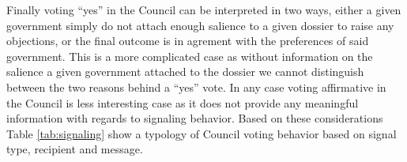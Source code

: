 Finally voting ``yes'' in the Council can be interpreted in two ways, either a given government simply do not attach enough salience to a given dossier to raise any objections, or the final outcome is in agrement with the preferences of said government. This is a more complicated case as without information on the salience a given government attached to the dossier we cannot distinguish between the two reasons behind a ``yes'' vote. In any case voting affirmative in the Council is less interesting case as it does not provide any meaningful information with regards to signaling behavior. Based on these considerations Table \ref{tab:signaling} show a typology of Council voting behavior based on signal type, recipient and message.

\begin{table}[htp]
  \centering
  \caption{Types of Signaling in the Council}
  \label{tab:signaling}
\end{table}

    

